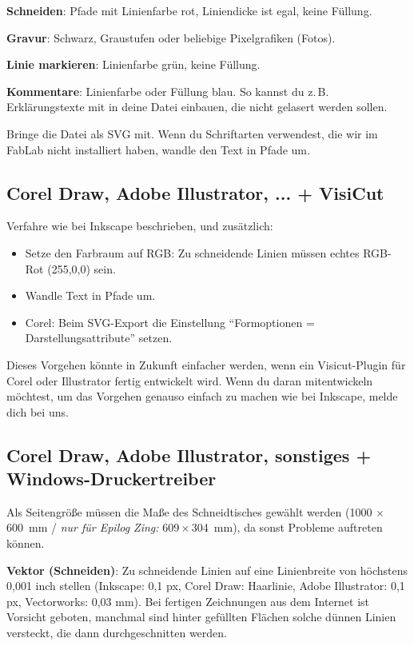 \documentclass{\basedir/fablab-document}
\newcommand{\nurZing}{\emph{nur für Epilog Zing:} }
\begin{document}
	\textbf{Schneiden}: Pfade mit Linienfarbe rot, Liniendicke ist egal, keine Füllung.

	\textbf{Gravur}: Schwarz, Graustufen oder beliebige Pixelgrafiken (Fotos).

	\textbf{Linie markieren}: Linienfarbe grün, keine Füllung.

	\textbf{Kommentare}: Linienfarbe oder Füllung blau. So kannst du z.\,B. Erklärungstexte mit in deine Datei einbauen, die nicht gelasert werden sollen.

	Bringe die Datei als SVG mit. Wenn du Schriftarten verwendest, die wir im FabLab nicht installiert haben, wandle den Text in Pfade um.


	\subsection{Corel Draw, Adobe Illustrator, ... + VisiCut}
	\label{corel-illustrator-svg-visicut}
	Verfahre wie bei Inkscape beschrieben, und zusätzlich:

	\begin{itemize}
		\item Setze den Farbraum auf RGB: Zu schneidende Linien müssen echtes RGB-Rot (255,0,0) sein.
		\item Wandle Text in Pfade um.
		\item Corel: Beim SVG-Export die Einstellung \enquote{Formoptionen = Darstellungsattribute} setzen.
	\end{itemize}

	Dieses Vorgehen könnte in Zukunft einfacher werden, wenn ein Visicut-Plugin für Corel oder Illustrator fertig entwickelt wird. Wenn du daran mitentwickeln möchtest, um das Vorgehen genauso einfach zu machen wie bei Inkscape, melde dich bei uns.

	\subsection{Corel Draw, Adobe Illustrator, sonstiges + Windows-Druckertreiber} \label{sec:einstellungen-windowstreiber}
	Als Seitengröße müssen die Maße des Schneidtisches gewählt werden (1000 $\times$ 600~mm / \nurZing 609\,$\times$\,304~mm), da sonst Probleme auftreten können.

	\textbf{Vektor (Schneiden)}: Zu schneidende Linien auf eine Linienbreite von höchstens 0,001 inch stellen (Inkscape: 0,1 px, Corel Draw: Haarlinie, Adobe Illustrator: 0,1 px, Vectorworks: 0,03 mm). Bei fertigen Zeichnungen aus dem Internet ist Vorsicht geboten, manchmal sind hinter gefüllten Flächen solche dünnen Linien versteckt, die dann durchgeschnitten werden.
\end{document}
